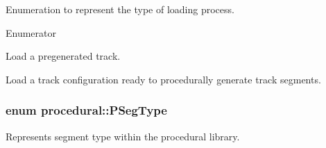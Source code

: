 Enumeration to represent the type of loading process. 

\begin{Desc}
\item[Enumerator]\par
\begin{description}
\item[{\em 
\hypertarget{namespaceprocedural_a1a0de85ffebb5ee366eb8374b42edac7a88c931bb80a6ea2db2b99a21ea648f9a}{T\-R\-A\-C\-K}\label{namespaceprocedural_a1a0de85ffebb5ee366eb8374b42edac7a88c931bb80a6ea2db2b99a21ea648f9a}
}]Load a pregenerated track. \item[{\em 
\hypertarget{namespaceprocedural_a1a0de85ffebb5ee366eb8374b42edac7a5c08cdbaee11dc085deb173382238ba5}{C\-O\-N\-F\-I\-G}\label{namespaceprocedural_a1a0de85ffebb5ee366eb8374b42edac7a5c08cdbaee11dc085deb173382238ba5}
}]Load a track configuration ready to procedurally generate track segments. \end{description}
\end{Desc}
\hypertarget{namespaceprocedural_a50f6e9669ba957b95f24713757bd0f20}{
\subsubsection[{P\-Seg\-Type}]{\setlength{\rightskip}{0pt plus 5cm}enum {\bf procedural\-::\-P\-Seg\-Type}}}\label{namespaceprocedural_a50f6e9669ba957b95f24713757bd0f20}


Represents segment type within the procedural library. 

